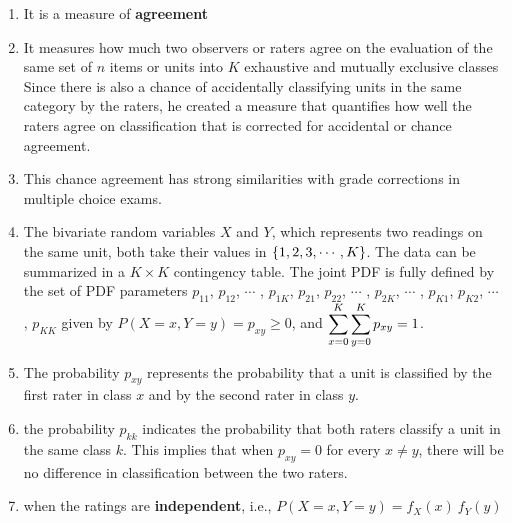 \begin{enumerate}
    \item It is a measure of \textbf{agreement}
    \hfill \cite{statistics/book/Statistics-for-Data-Scientists/Maurits-Kaptein}

    \item It measures how much two observers or raters agree on the evaluation of the same set of $n$ items or units into $K$ exhaustive and mutually exclusive classes
    Since there is also a chance of accidentally classifying units in the same category by the raters, he created a measure that quantifies how well the raters agree on classification that is corrected for accidental or chance agreement.
    \hfill \cite{statistics/book/Statistics-for-Data-Scientists/Maurits-Kaptein}

    \item This chance agreement has strong similarities with grade corrections in multiple choice exams.
    \hfill \cite{statistics/book/Statistics-for-Data-Scientists/Maurits-Kaptein}

    \item The bivariate random variables $X$ and $Y$, which represents two readings on the same unit, both take their values in $\left\{1, 2, 3, \cdots , K \right\}$.
    The data can be summarized in a $K \times K$ contingency table.
    The joint PDF is fully defined by the set of PDF parameters $p_{11}$, $p_{12}$, $\cdots$ , $p_{1K}$, $p_{21}$, $p_{22}$, $\cdots$ , $p_{2K}$, $\cdots$ , $p_{K 1}$, $p_{K 2}$, $\cdots$ , $p_{K K}$ given by $P(X = x, Y = y) = p_{x y} \geq 0$, and $\displaystyle\sum^K_{x=0} \displaystyle\sum^K_{y=0} p_{x y} = 1$.
    \hfill \cite{statistics/book/Statistics-for-Data-Scientists/Maurits-Kaptein}

    \item The probability $p_{x y}$ represents the probability that a unit is classified by the first rater in class $x$ and by the second rater in class $y$.
    \hfill \cite{statistics/book/Statistics-for-Data-Scientists/Maurits-Kaptein}

    \item the probability $p_{kk}$ indicates the probability that both raters classify a unit in the same class $k$.
    This implies that when $p_{x y} = 0$ for every $x \neq y$, there will be no difference in classification between the two raters.
    \hfill \cite{statistics/book/Statistics-for-Data-Scientists/Maurits-Kaptein}

    \item when the ratings are \textbf{independent}, i.e., $P(X = x, Y = y) = f_X (x)\ f_Y (y)$
    \hfill \cite{statistics/book/Statistics-for-Data-Scientists/Maurits-Kaptein}


\end{enumerate}
